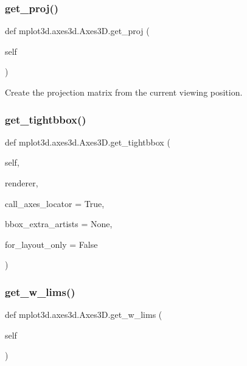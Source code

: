 \subsubsection{\texorpdfstring{get\+\_\+proj()}{get\_proj()}}
{\footnotesize\ttfamily def mplot3d.\+axes3d.\+Axes3\+D.\+get\+\_\+proj (\begin{DoxyParamCaption}\item[{}]{self }\end{DoxyParamCaption})}

\begin{DoxyVerb}Create the projection matrix from the current viewing position.\end{DoxyVerb}
 \mbox{\label{classmplot3d_1_1axes3d_1_1Axes3D_a0b22ad96fa54eb2b580818f22f49e84b}} 
\subsubsection{\texorpdfstring{get\+\_\+tightbbox()}{get\_tightbbox()}}
{\footnotesize\ttfamily def mplot3d.\+axes3d.\+Axes3\+D.\+get\+\_\+tightbbox (\begin{DoxyParamCaption}\item[{}]{self,  }\item[{}]{renderer,  }\item[{}]{call\+\_\+axes\+\_\+locator = {\ttfamily True},  }\item[{}]{bbox\+\_\+extra\+\_\+artists = {\ttfamily None},  }\item[{}]{for\+\_\+layout\+\_\+only = {\ttfamily False} }\end{DoxyParamCaption})}

\mbox{\label{classmplot3d_1_1axes3d_1_1Axes3D_a1615b0281495d39cb8635be9d074770e}} 
\subsubsection{\texorpdfstring{get\+\_\+w\+\_\+lims()}{get\_w\_lims()}}
{\footnotesize\ttfamily def mplot3d.\+axes3d.\+Axes3\+D.\+get\+\_\+w\+\_\+lims (\begin{DoxyParamCaption}\item[{}]{self }\end{DoxyParamCaption})}


